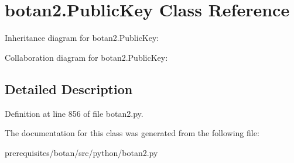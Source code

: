 \hypertarget{classbotan2_1_1_public_key}{}\section{botan2.\+Public\+Key Class Reference}
\label{classbotan2_1_1_public_key}


Inheritance diagram for botan2.\+Public\+Key\+:


Collaboration diagram for botan2.\+Public\+Key\+:


\subsection{Detailed Description}


Definition at line 856 of file botan2.\+py.



The documentation for this class was generated from the following file\+:\begin{DoxyCompactItemize}
\item 
prerequisites/botan/src/python/botan2.\+py\end{DoxyCompactItemize}
